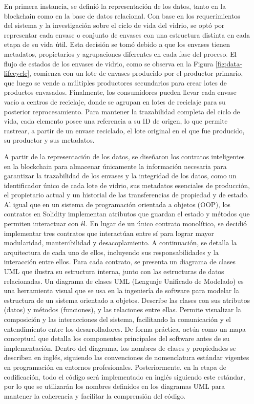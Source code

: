 En primera instancia, se definió la representación de los datos, tanto en la blockchain como en la base de datos relacional. Con base en los requerimientos del sistema y la investigación sobre el ciclo de vida del vidrio, se optó por representar cada envase o conjunto de envases con una estructura distinta en cada etapa de su vida útil. Esta decisión se tomó debido a que los envases tienen metadatos, propietarios y agrupaciones diferentes en cada fase del proceso. El flujo de estados de los envases de vidrio, como se observa en la Figura \ref{fig:data-lifecycle}, comienza con un lote de envases producido por el productor primario, que luego se vende a múltiples productores secundarios para crear lotes de productos envasados. Finalmente, los consumidores pueden llevar cada envase vacío a centros de reciclaje, donde se agrupan en lotes de reciclaje para su posterior reprocesamiento. Para mantener la trazabilidad completa del ciclo de vida, cada elemento posee una referencia a su ID de origen, lo que permite rastrear, a partir de un envase reciclado, el lote original en el que fue producido, su productor y sus metadatos.

A partir de la representación de los datos, se diseñaron los contratos inteligentes en la blockchain para almacenar únicamente la información necesaria para garantizar la trazabilidad de los envases y la integridad de los datos, como un identificador único de cada lote de vidrio, sus metadatos esenciales de producción, el propietario actual y un historial de las transferencias de propiedad y de estado. Al igual que en un sistema de programación orientada a objetos (OOP), los contratos en Solidity implementan atributos que guardan el estado y métodos que permiten interactuar con él. En lugar de un único contrato monolítico, se decidió implementar tres contratos que interactúan entre sí para lograr mayor modularidad, mantenibilidad y desacoplamiento. A continuación, se detalla la arquitectura de cada uno de ellos, incluyendo sus responsabilidades y la interacción entre ellos. Para cada contrato, se presenta un diagrama de clases UML que ilustra su estructura interna, junto con las estructuras de datos relacionadas. Un diagrama de clases UML (Lenguaje Unificado de Modelado) es una herramienta visual que se usa en la ingeniería de software para modelar la estructura de un sistema orientado a objetos. Describe las clases con sus atributos (datos) y métodos (funciones), y las relaciones entre ellas. Permite visualizar la composición y las interacciones del sistema, facilitando la comunicación y el entendimiento entre los desarrolladores. De forma práctica, actúa como un mapa conceptual que detalla los componentes principales del software antes de su implementación. Dentro del diagrama, los nombres de clases y propiedades se describen en inglés, siguiendo las convenciones de nomenclatura estándar vigentes en programación en entornos profesionales. Posteriormente, en la etapa de codificación, todo el código será implementado en inglés siguiendo este estándar, por lo que se utilizarán los nombres definidos en los diagramas UML para mantener la coherencia y facilitar la comprensión del código.

